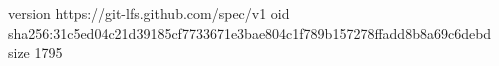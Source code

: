 version https://git-lfs.github.com/spec/v1
oid sha256:31c5ed04c21d39185cf7733671e3bae804c1f789b157278ffadd8b8a69c6debd
size 1795
